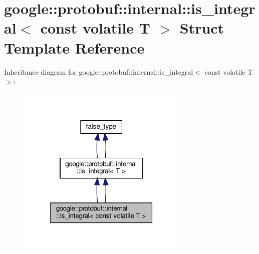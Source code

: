 \hypertarget{structgoogle_1_1protobuf_1_1internal_1_1is__integral_3_01const_01volatile_01T_01_4}{}\section{google\+:\+:protobuf\+:\+:internal\+:\+:is\+\_\+integral$<$ const volatile T $>$ Struct Template Reference}
\label{structgoogle_1_1protobuf_1_1internal_1_1is__integral_3_01const_01volatile_01T_01_4}


Inheritance diagram for google\+:\+:protobuf\+:\+:internal\+:\+:is\+\_\+integral$<$ const volatile T $>$\+:
\nopagebreak
\begin{figure}[H]
\begin{center}
\leavevmode
\includegraphics[width=232pt]{structgoogle_1_1protobuf_1_1internal_1_1is__integral_3_01const_01volatile_01T_01_4__inherit__graph}
\end{center}
\end{figure}


